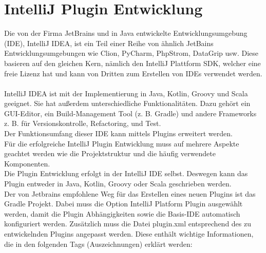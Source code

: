 \section{IntelliJ Plugin Entwicklung}
Die von der Firma JetBrains und in Java entwickelte Entwicklungsumgebung (IDE), IntelliJ IDEA, ist ein Teil einer Reihe von ähnlich JetBains Entwicklungsumgebungen wie Clion, PyCharm, PhpStrom, DataGrip usw. Diese basieren  auf den gleichen Kern, nämlich den IntelliJ Plattform SDK, welcher eine freie Lizenz hat und kann von Dritten zum Erstellen von IDEs verwendet werden.\\ \\
IntelliJ IDEA ist mit der Implementierung in Java, Kotlin, Groovy und Scala geeignet. Sie hat außerdem unterschiedliche Funktionalitäten. Dazu gehört ein GUI-Editor, ein Build-Management Tool (z. B. Gradle) und andere Frameworks z. B. für Versionskontrolle, Refactoring, und Test.\\
Der Funktionsumfang dieser IDE kann mittels Plugins erweitert werden. \\
Für die erfolgreiche IntelliJ Plugin Entwicklung muss auf mehrere Aspekte geachtet werden wie die Projektstruktur und die häufig verwendete Komponenten.\\
Die Plugin Entwicklung erfolgt in der IntelliJ IDE selbst. Deswegen kann das Plugin entweder in Java, Kotlin, Groovy oder Scala geschrieben werden.\\
Der von Jetbrains empfohlene Weg für das Erstellen eines neuen Plugins ist das Gradle Projekt. Dabei muss die Option IntelliJ Platform Plugin ausgewählt werden, damit die Plugin Abhängigkeiten sowie die Basis-IDE automatisch konfiguriert werden. Zusätzlich muss die Datei plugin.xml entsprechend des zu entwickelnden Plugins angepasst werden. Diese enthält wichtige Informationen, die in den folgenden Tags (Auszeichnungen) erklärt werden:
